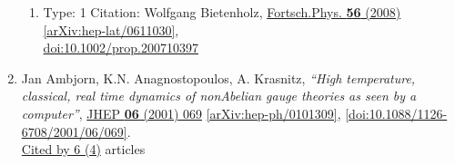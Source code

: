 \documentclass[a4paper,10pt]{article}
\begin{document}
\begin{enumerate}
\begin{enumerate}
  \item Type: 1 Citation: Wolfgang Bietenholz, \href{https://www.doi.org/10.1002/prop.200710397}{Fortsch.Phys. {\bf 56} (2008) }  \href{https://arxiv.org/abs/hep-lat/0611030}{[arXiv:hep-lat/0611030]},\\\href{https://www.doi.org/10.1002/prop.200710397}{doi:10.1002/prop.200710397}
\end{enumerate}
\item Jan Ambjorn, K.N. Anagnostopoulos, A. Krasnitz, {\it ``High temperature, classical, real time dynamics of nonAbelian gauge theories as seen by a computer''}, \href{https://www.doi.org/10.1088/1126-6708/2001/06/069}{JHEP {\bf 06} (2001) 069} \href{https://arxiv.org/abs/hep-ph/0101309}{[arXiv:hep-ph/0101309]}, \href{https://www.doi.org/10.1088/1126-6708/2001/06/069}{[doi:10.1088/1126-6708/2001/06/069]}.
\\\href{https://inspirehep.net/literature/?q=refersto%3Arecid%3A552548}{Cited by 6 (4)} articles


\end{enumerate}
\end{document}
